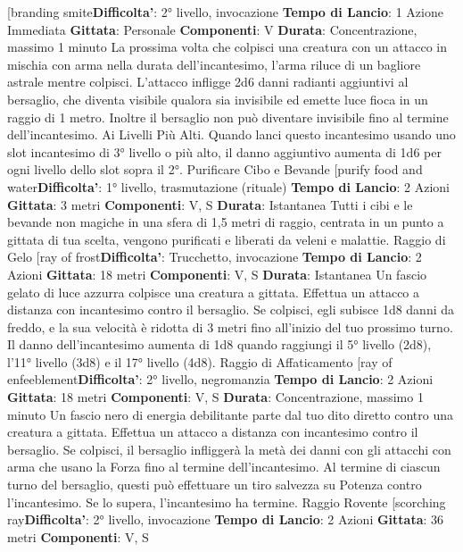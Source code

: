 \begin{multicols}{2}
[branding smite\textbf{Difficolta'}:
2° livello, invocazione
\textbf{Tempo di Lancio}: 1 Azione Immediata
\textbf{Gittata}: Personale
\textbf{Componenti}: V
\textbf{Durata}: Concentrazione, massimo 1 minuto
La prossima volta che colpisci una creatura con un
attacco in mischia con arma nella durata
dell’incantesimo, l’arma riluce di un bagliore astrale
mentre colpisci. L’attacco infligge 2d6 danni radianti
aggiuntivi al bersaglio, che diventa visibile qualora sia
invisibile ed emette luce fioca in un raggio di 1 metro.
Inoltre il bersaglio non può diventare invisibile fino al
termine dell’incantesimo.
Ai Livelli Più Alti. Quando lanci questo incantesimo
usando uno slot incantesimo di 3° livello o più alto, il
danno aggiuntivo aumenta di 1d6 per ogni livello dello
slot sopra il 2°.
Purificare Cibo e Bevande
[purify food and water\textbf{Difficolta'}:
1° livello, trasmutazione (rituale)
\textbf{Tempo di Lancio}: 2 Azioni
\textbf{Gittata}: 3 metri
\textbf{Componenti}: V, S
\textbf{Durata}: Istantanea
Tutti i cibi e le bevande non magiche in una sfera di 1,5
metri di raggio, centrata in un punto a gittata di tua
scelta, vengono purificati e liberati da veleni e malattie.
Raggio di Gelo
[ray of frost\textbf{Difficolta'}:
Trucchetto, invocazione
\textbf{Tempo di Lancio}: 2 Azioni
\textbf{Gittata}: 18 metri
\textbf{Componenti}: V, S
\textbf{Durata}: Istantanea
Un fascio gelato di luce azzurra colpisce una creatura a
gittata. Effettua un attacco a distanza con incantesimo
contro il bersaglio. Se colpisci, egli subisce 1d8 danni
da freddo, e la sua velocità è ridotta di 3 metri fino
all’inizio del tuo prossimo turno.
Il danno dell’incantesimo aumenta di 1d8 quando
raggiungi il 5° livello (2d8), l’11° livello (3d8) e il 17°
livello (4d8).
Raggio di Affaticamento
[ray of enfeeblement\textbf{Difficolta'}:
2° livello, negromanzia
\textbf{Tempo di Lancio}: 2 Azioni
\textbf{Gittata}: 18 metri
\textbf{Componenti}: V, S
\textbf{Durata}: Concentrazione, massimo 1 minuto
Un fascio nero di energia debilitante parte dal tuo dito
diretto contro una creatura a gittata. Effettua un attacco
a distanza con incantesimo contro il bersaglio. Se
colpisci, il bersaglio infliggerà la metà dei danni con gli
attacchi con arma che usano la Forza fino al termine
dell’incantesimo.
Al termine di ciascun turno del bersaglio, questi può
effettuare un tiro salvezza su Potenza contro
l’incantesimo. Se lo supera, l’incantesimo ha termine.
Raggio Rovente
[scorching ray\textbf{Difficolta'}:
2° livello, invocazione
\textbf{Tempo di Lancio}: 2 Azioni
\textbf{Gittata}: 36 metri
\textbf{Componenti}: V, S

\end{multicols}
